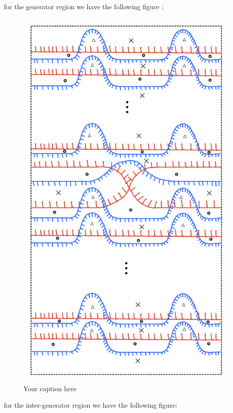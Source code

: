 for the generator region we have the following figure :
\begin{figure}[H] %
    \centering
    \includegraphics[scale = 0.95]{diagrams/natural_alternating_diagrams/11.png} %
    \caption{Your caption here}
    \label{fig:your-label}
\end{figure}
for the inter-generator region we have the following figure:
